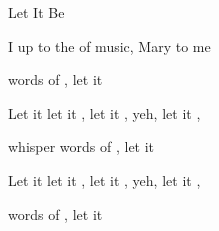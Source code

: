 \begin{SBSong}{Let It Be}
\begin{SBVerse}
    I  up to the  of music, 
     Mary  to me
    
     words of , let it  
  \end{SBVerse} 
  \begin{SBChorus}   
    Let it  let it , let it , yeh, let it , 

    whisper words of , let it  

    Let it  let it , let it , yeh, let it ,


    words of , let it   
  \end{SBChorus}
\end{SBSong}

